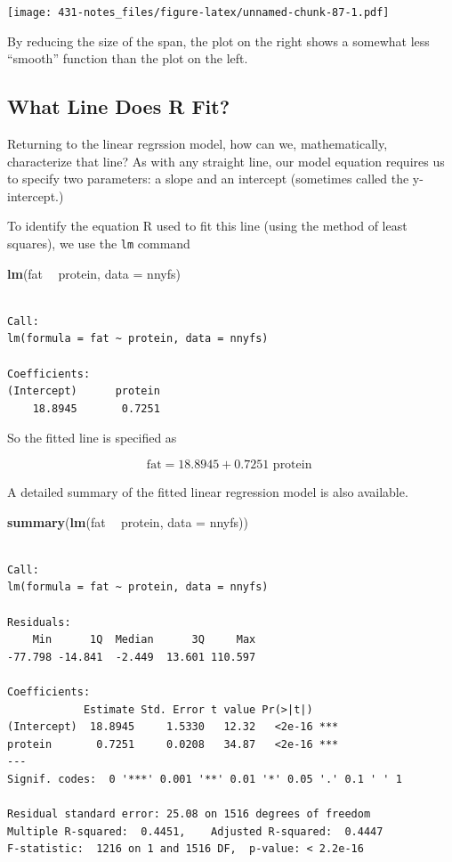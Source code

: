 \documentclass[
]{book}
\newenvironment{Shaded}{\begin{snugshade}}{\end{snugshade}}
\newcommand{\DataTypeTok}[1]{\textcolor[rgb]{0.13,0.29,0.53}{#1}}
\newcommand{\KeywordTok}[1]{\textcolor[rgb]{0.13,0.29,0.53}{\textbf{#1}}}
\newcommand{\NormalTok}[1]{#1}
\newcommand{\OperatorTok}[1]{\textcolor[rgb]{0.81,0.36,0.00}{\textbf{#1}}}
\newcommand{\StringTok}[1]{\textcolor[rgb]{0.31,0.60,0.02}{#1}}
\begin{document}
\texttt{[image: 431-notes\_files/figure-latex/unnamed-chunk-87-1.pdf]}

By reducing the size of the span, the plot on the right shows a somewhat less ``smooth'' function than the plot on the left.

\hypertarget{what-line-does-r-fit}{%
\subsection{What Line Does R Fit?}\label{what-line-does-r-fit}}

Returning to the linear regrssion model, how can we, mathematically, characterize that line? As with any straight line, our model equation requires us to specify two parameters: a slope and an intercept (sometimes called the y-intercept.)

To identify the equation R used to fit this line (using the method of least squares), we use the \texttt{lm} command

\begin{Shaded}
\begin{Highlighting}[]
\KeywordTok{lm}\NormalTok{(fat }\OperatorTok{~}\StringTok{ }\NormalTok{protein, }\DataTypeTok{data =}\NormalTok{ nnyfs)}
\end{Highlighting}
\end{Shaded}

\begin{verbatim}

Call:
lm(formula = fat ~ protein, data = nnyfs)

Coefficients:
(Intercept)      protein  
    18.8945       0.7251  
\end{verbatim}

So the fitted line is specified as

\[
\mbox{fat} = 18.8945 + 0.7251 \mbox{ protein }
\]

A detailed summary of the fitted linear regression model is also available.

\begin{Shaded}
\begin{Highlighting}[]
\KeywordTok{summary}\NormalTok{(}\KeywordTok{lm}\NormalTok{(fat }\OperatorTok{~}\StringTok{ }\NormalTok{protein, }\DataTypeTok{data =}\NormalTok{ nnyfs))}
\end{Highlighting}
\end{Shaded}

\begin{verbatim}

Call:
lm(formula = fat ~ protein, data = nnyfs)

Residuals:
    Min      1Q  Median      3Q     Max 
-77.798 -14.841  -2.449  13.601 110.597 

Coefficients:
            Estimate Std. Error t value Pr(>|t|)    
(Intercept)  18.8945     1.5330   12.32   <2e-16 ***
protein       0.7251     0.0208   34.87   <2e-16 ***
---
Signif. codes:  0 '***' 0.001 '**' 0.01 '*' 0.05 '.' 0.1 ' ' 1

Residual standard error: 25.08 on 1516 degrees of freedom
Multiple R-squared:  0.4451,	Adjusted R-squared:  0.4447 
F-statistic:  1216 on 1 and 1516 DF,  p-value: < 2.2e-16
\end{verbatim}
\end{document}

